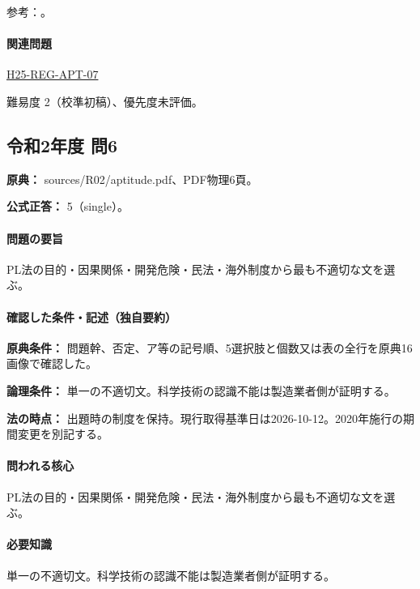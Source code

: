 \par 参考：\cite{pl_statute,pl_qa,pl_definitions2018}。

\paragraph{関連問題} \hyperref[q:h25-reg-apt-07]{H25-REG-APT-07}

\par 難易度 2（校準初稿）、優先度未評価。

\subsection{令和2年度 問6}
\label{q:r02-reg-apt-06}

\noindent\textbf{原典：} sources/R02/aptitude.pdf、PDF物理6頁。

\textbf{公式正答：} 5（single）。

\paragraph{問題の要旨} PL法の目的・因果関係・開発危険・民法・海外制度から最も不適切な文を選ぶ。

\paragraph{確認した条件・記述（独自要約）}\mbox{}\par

\noindent\textbf{原典条件：} 問題幹、否定、ア等の記号順、5選択肢と個数又は表の全行を原典16画像で確認した。\par

\noindent\textbf{論理条件：} 単一の不適切文。科学技術の認識不能は製造業者側が証明する。\par

\noindent\textbf{法の時点：} 出題時の制度を保持。現行取得基準日は2026-10-12。2020年施行の期間変更を別記する。\par

\paragraph{問われる核心} PL法の目的・因果関係・開発危険・民法・海外制度から最も不適切な文を選ぶ。

\paragraph{必要知識} 単一の不適切文。科学技術の認識不能は製造業者側が証明する。

